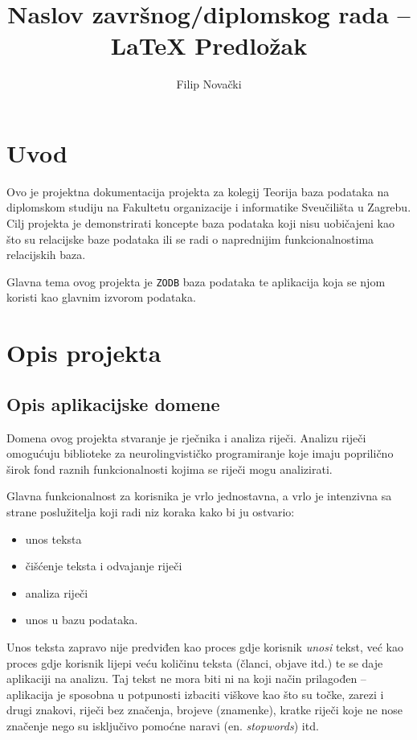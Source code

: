 \documentclass{foi}
\title{Naslov završnog/diplomskog rada -- LaTeX Predložak}
\author{Filip Novački}
\begin{document}
\maketitle
\tableofcontents

\chapter{Uvod}

Ovo je projektna dokumentacija projekta za kolegij Teorija baza podataka na
diplomskom studiju na Fakultetu organizacije i informatike Sveučilišta u
Zagrebu. Cilj projekta je demonstrirati koncepte baza podataka koji nisu
uobičajeni kao što su relacijske baze podataka ili se radi o naprednijim
funkcionalnostima relacijskih baza.

Glavna tema ovog projekta je \texttt{ZODB} baza podataka te aplikacija koja se
njom koristi kao glavnim izvorom podataka.

\chapter{Opis projekta}

\section{Opis aplikacijske domene}

Domena ovog projekta stvaranje je rječnika i analiza riječi. Analizu riječi
omogućuju biblioteke za neurolingvističko programiranje koje imaju poprilično
širok fond raznih funkcionalnosti kojima se riječi mogu analizirati.

Glavna funkcionalnost za korisnika je vrlo jednostavna, a vrlo je intenzivna sa
strane poslužitelja koji radi niz koraka kako bi ju ostvario:
\begin{itemize}
	\item unos teksta
	\item čišćenje teksta i odvajanje riječi
	\item analiza riječi
	\item unos u bazu podataka.
\end{itemize}

Unos teksta zapravo nije predviđen kao proces gdje korisnik \textit{unosi}
tekst, već kao proces gdje korisnik lijepi veću količinu teksta (članci, objave
itd.) te se daje aplikaciji na analizu. Taj tekst ne mora biti ni na koji način
prilagođen -- aplikacija je sposobna u potpunosti izbaciti viškove kao što su
točke, zarezi i drugi znakovi, riječi bez značenja, brojeve (znamenke), kratke
riječi koje ne nose značenje nego su isključivo pomoćne naravi (en.
\textit{stopwords}) itd.
\end{document}
